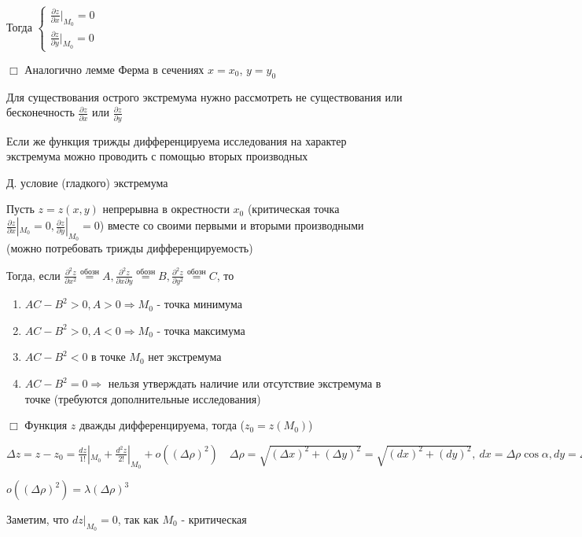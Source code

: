 \documentclass[12pt]{article}
\begin{document}
    Тогда $\begin{cases}\frac{\partial z}{\partial x} |_{M_0} = 0 \\ \frac{\partial z}{\partial y} |_{M_0} = 0\end{cases}$

    $\Box$ Аналогично лемме Ферма в сечениях $x = x_0$, $y = y_0$

    Для существования острого экстремума нужно рассмотреть не существования или бесконечность $\frac{\partial z}{\partial x}$ или $\frac{\partial z}{\partial y}$

    Если же функция трижды дифференцируема исследования на характер экстремума можно проводить с помощью вторых производных

    \Th Д. условие (гладкого) экстремума

    Пусть $z = z(x, y)$ непрерывна в окрестности $x_0$ (критическая точка $\frac{\partial z}{\partial x} |_{M_0} = 0, \frac{\partial z}{\partial y} |_{M_0} = 0$)
    вместе со своими первыми и вторыми производными (можно потребовать трижды дифференцируемость)

    Тогда, если $\frac{\partial^2 z}{\partial x^2} \stackrel{\text{обозн}}{=} A, \frac{\partial^2 z}{\partial x \partial y} \stackrel{\text{обозн}}{=} B, \frac{\partial^2 z}{\partial y^2} \stackrel{\text{обозн}}{=} C$, то

    \begin{enumerate}
        \item $AC - B^2 > 0, A > 0 \Longrightarrow M_0$ - точка минимума
        \item $AC - B^2 > 0, A < 0 \Longrightarrow M_0$ - точка максимума
        \item $AC - B^2 < 0$ в точке $M_0$ нет экстремума
        \item $AC - B^2 = 0\Longrightarrow$ нельзя утверждать наличие или отсутствие экстремума в точке (требуются дополнительные исследования)
    \end{enumerate}

    $\Box$ Функция $z$ дважды дифференцируема, тогда ($z_0 = z(M_0)$)

    $\Delta z = z - z_0 = \frac{dz}{1!} |_{M_0} + \frac{d^2 z}{2!} |_{M_0} + o((\Delta \rho)^2) \quad \Delta \rho = \sqrt{(\Delta x)^2 + (\Delta y)^2} = \sqrt{(dx)^2 + (dy)^2}, \ dx = \Delta\rho \cos\alpha, dy = \Delta\rho \sin\alpha$

    $o((\Delta \rho)^2) = \lambda (\Delta \rho)^3$

    Заметим, что $dz |_{M_0} = 0$, так как $M_0$ - критическая
\end{document}
